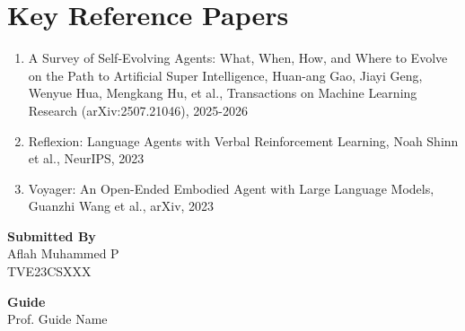 \documentclass[12pt]{article}
\newcommand{\studentname}{Aflah Muhammed P}
\newcommand{\rollno}{TVE23CSXXX}
\newcommand{\guidename}{Prof. Guide Name}
\begin{document}
\section*{Key Reference Papers}
\begin{enumerate}
  \item A Survey of Self-Evolving Agents: What, When, How, and Where to Evolve on the Path to Artificial Super Intelligence, Huan-ang Gao, Jiayi Geng, Wenyue Hua, Mengkang Hu, et al., Transactions on Machine Learning Research (arXiv:2507.21046), 2025-2026
  \item Reflexion: Language Agents with Verbal Reinforcement Learning, Noah Shinn et al., NeurIPS, 2023
  \item Voyager: An Open-Ended Embodied Agent with Large Language Models, Guanzhi Wang et al., arXiv, 2023
\end{enumerate}
\vspace{1.5em}

\noindent\textbf{Submitted By}\\
\studentname\\
\rollno

\vspace{1em}
\noindent\textbf{Guide}\\
\guidename
\end{document}

